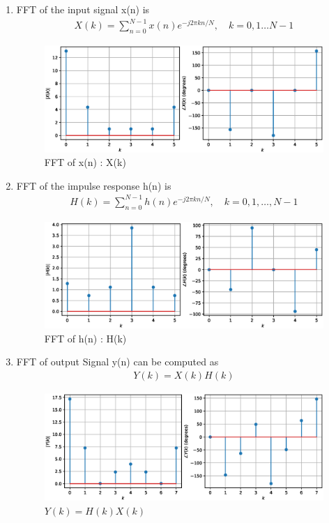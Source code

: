 \documentclass[journal,12pt,twocolumn]{IEEEtran}
\renewcommand\thesection{\arabic{section}}
\begin{document}
\begin{enumerate}[label=\thesection.\arabic*.,ref=\thesection.\theenumi]
\item FFT of the input signal x(n) is 
\begin{align}
    X(k) = \sum_{n=0}^{N-1} x(n) e^{-j 2 \pi k n / N}, \quad k=0,1 \ldots N-1
\end{align}
\begin{figure}[h!]
    \centering
    \includegraphics[width=\columnwidth]{./figs/X.eps}
    \caption{FFT of x(n) : X(k)}
    \label{Xk}
\end{figure}
\item FFT of the impulse response h(n) is 
\begin{align}
    H(k) = \sum_{n=0}^{N-1} h(n) e^{-j 2 \pi k n / N}, \quad k=0,1, \ldots, N-1
\end{align}

\begin{figure}[ht]
    \centering
    \includegraphics[width=\columnwidth]{./figs/H.eps}
    \caption{FFT of h(n) : H(k)}
    \label{Hk}
\end{figure}

\item  FFT of output Signal y(n) can be computed as 
\begin{align}
    Y(k) = X(k)H(k)
    \label{eq:eq1}
\end{align}

\begin{figure}[ht]
    \centering
    \includegraphics[width=\columnwidth]{./figs/Y.eps}
    \caption{$Y(k) = H(k)X(k)$}
    \label{Yk}
\end{figure}


\end{enumerate}
\end{document}
